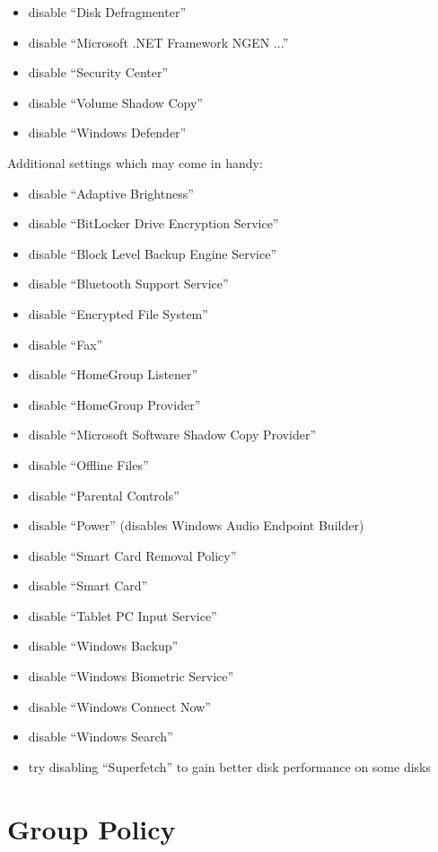 \documentclass{itsarticle}
\begin{document}
\begin{itemize}
    \item disable ``Disk Defragmenter''
    \item disable ``Microsoft .NET Framework NGEN ...''
    \item disable ``Security Center''
    \item disable ``Volume Shadow Copy''
    \item disable ``Windows Defender''
\end{itemize}

Additional settings which may come in handy:

\begin{itemize}
    \item disable ``Adaptive Brightness''
    \item disable ``BitLocker Drive Encryption Service''
    \item disable ``Block Level Backup Engine Service''
    \item disable ``Bluetooth Support Service''
    \item disable ``Encrypted File System''
    \item disable ``Fax''
    \item disable ``HomeGroup Listener''
    \item disable ``HomeGroup Provider''
    \item disable ``Microsoft Software Shadow Copy Provider''
    \item disable ``Offline Files''
    \item disable ``Parental Controls''
    \item disable ``Power'' (disables Windows Audio Endpoint Builder)
    \item disable ``Smart Card Removal Policy''
    \item disable ``Smart Card''
    \item disable ``Tablet PC Input Service''
    \item disable ``Windows Backup''
    \item disable ``Windows Biometric Service''
    \item disable ``Windows Connect Now''
    \item disable ``Windows Search''
    \item try disabling ``Superfetch'' to gain better disk performance on some
        disks
\end{itemize}

\section{Group Policy}
\label{sec:group_policty}
\end{document}
